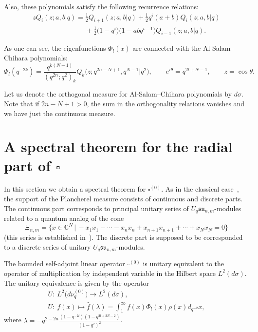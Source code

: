 Also, these polynomials satisfy the following recurrence relations:
\begin{gather}
zQ_i(z;a,b|q)=\frac12
Q_{i+1}(z;a,b|q)+\frac12q^i(a+b)Q_i(z;a,b|q)\nonumber\\
\phantom{zQ_i(z;a,b|q)=}{} +\frac12\big(1-q^i\big)\big(1-abq^{i-1}\big)Q_{i-1}(z;a,b|q).\label{rec_ASC}
\end{gather}

As one can see, the eigenfunctions $\Phi_l(x)$ are connected with the Al-Salam--Chihara polynomials:
\[
\Phi_l(q^{-2k}) = \frac{q^{k(N-1)}}{(q^{2n};q^2)_k}Q_k\big(z;q^{2n-N+1},q^{N-1}|q^2\big), \qquad
e^{i\theta}=q^{2l+N-1},\qquad z=\cos\theta.
\]

Let us denote the orthogonal measure for Al-Salam--Chihara polynomials by $d\sigma$.  Note that if $2n-N+1>0$,
the sum in the orthogonality relations vanishes and we have just the continuous measure.



\section[A spectral theorem for the radial part of $\square$]{A spectral theorem for the radial part of $\boldsymbol{\square}$}\label{sec_9}

In this section we obtain a spectral theorem for $\square^{(0)}$. As in the classical case~\cite[pp.~429--432]{Faraut}, the support of the Plancherel measure consists of continuous and discrete parts.
The continuous part corresponds to principal unitary series of $U_q \mathfrak{su}_{n,m}$-modules related to a
quantum analog of the cone
\[
\Xi_{n,m}=\big\{x \in \mathbb C^{N}\,|\, {-}x_1 \bar{x}_1-\cdots -x_n \bar{x}_n + x_{n+1}\bar{x}_{n+1}+\cdots
+x_N\bar{x}_N=0\big\}
\]
(this series is established in~\cite{BS}). The discrete part is supposed to be corresponded to a discrete
series of unitary $U_q \mathfrak{su}_{n,m}$-modules.

\begin{theorem}
The bounded self-adjoint linear operator $\square^{(0)}$ is unitary equivalent to the operator of
multiplication by independent variable in the Hilbert space $L^2(d\sigma)$. The unitary equivalence is given
by the operator
\begin{gather*}
U:\  L^2\big(d\nu_q^{(0)}\big)  \rightarrow L^2(d\sigma),
\\
U:\ f(x) \mapsto\hat{f}(\lambda)=\int_1^\infty f(x)\Phi_l(x)\rho(x)d_{q^{-2}}x,
\end{gather*}
where $\lambda=-q^{2-2n}\frac{(1-q^{-2l})(1-q^{2l+2N-2})}{(1-q^2)^2}$.
\end{theorem}

